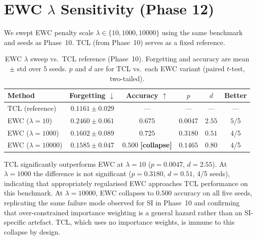 \section{EWC $\lambda$ Sensitivity (Phase 12)}
\label{app:ewc-sweep}

We swept EWC penalty scale $\lambda \in \{10, 1000, 10000\}$ using
the same benchmark and seeds as Phase~10. TCL (from Phase~10) serves as a fixed reference.

\begin{table}[h]
\centering
\caption{EWC $\lambda$ sweep vs.\ TCL reference (Phase~10). Forgetting and accuracy are
mean $\pm$ std over 5 seeds. $p$ and $d$ are for TCL vs.\ each EWC variant
(paired $t$-test, two-tailed).}
\label{tab:ewc-sweep}
\begin{tabular}{lccccc}
\toprule
Method & Forgetting $\downarrow$ & Accuracy $\uparrow$ & $p$ & $d$ & Better \\
\midrule
TCL (reference) & $0.1161 \pm 0.029$ & --- & --- & --- & --- \\
EWC ($\lambda=10$) & $0.2460 \pm 0.061$ & $0.675$ & $0.0047$ & $2.55$ & $5$/5 \\
EWC ($\lambda=1000$) & $0.1602 \pm 0.089$ & $0.725$ & $0.3180$ & $0.51$ & $4$/5 \\
EWC ($\lambda=10000$) & $0.1585 \pm 0.047$ & $0.500$ \textbf{[collapse]} & $0.1465$ & $0.80$ & $4$/5 \\
\bottomrule
\end{tabular}
\end{table}

TCL significantly outperforms EWC at $\lambda = 10$ ($p = 0.0047$, $d = 2.55$).
At $\lambda = 1000$ the difference is not significant ($p = 0.3180$, $d = 0.51$,
4/5 seeds), indicating that appropriately regularised EWC approaches TCL performance
on this benchmark. At $\lambda = 10000$, EWC collapses to $0.500$ accuracy on all
five seeds, replicating the same failure mode observed for SI in Phase~10 and
confirming that over-constrained importance weighting is a general hazard rather than
an SI-specific artefact. TCL, which uses no importance weights, is immune to this
collapse by design.
